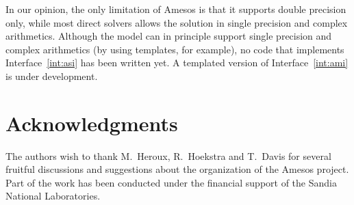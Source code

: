 \documentclass[acmtocl]{acmtrans2m}
\begin{document}
In our opinion, the only limitation of Amesos is that it supports double
precision only, while most direct solvers allows the solution in single
precision and complex arithmetics.  Although the model can in principle
support single precision and complex arithmetics (by using templates, for
                                                  example), no code that
implements Interface~\ref{int:asi} has been written yet. A templated version
of Interface~\ref{int:ami} is under development.

\section*{Acknowledgments}

The authors wish to thank M.~Heroux, R.~Hoekstra and T.~Davis for several
fruitful discussions and suggestions about the organization of the Amesos
project. Part of the work has been conducted under the financial support of
the Sandia National Laboratories.



\end{document}
